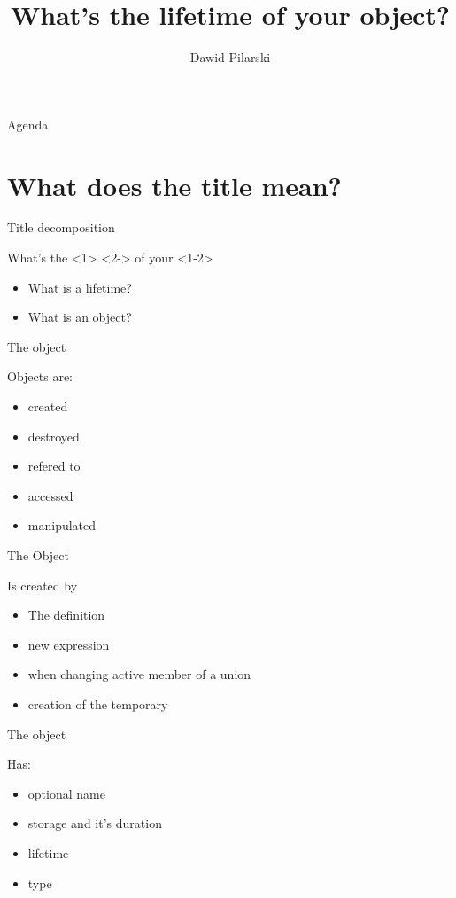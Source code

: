 \documentclass{panicsoftware-presentation}
\title{What's the lifetime of your object?}
\author{Dawid Pilarski}
\makeatletter
\newenvironment{itemizeSeq}{\begin{itemize}[<+-|@alert+>]}{\end{itemize}}
\makeatother
\begin{document}
\begin{frame}{Agenda}
	\tableofcontents
\end{frame}

\section{What does the title mean?}

\begin{frame}{Title decomposition}

\centerline{What's the <1> <2-> of your <1-2> }
\pause
\begin{itemizeSeq}
	\item What is a lifetime?
	\item What is an object?
\end{itemizeSeq}

\end{frame}

\begin{frame}{The object}

Objects are:
\begin{itemizeSeq}
	\item created
	\item destroyed
	\item refered to
	\item accessed
	\item manipulated
\end{itemizeSeq}

\end{frame}

\begin{frame}{The Object}

Is created by
\begin{itemizeSeq}
	\item The definition
	\item new expression
	\item when changing active member of a union
	\item creation of the temporary
\end{itemizeSeq}


\end{frame}

\begin{frame}{The object}

Has:
\begin{itemizeSeq}
	\item optional name
	\item storage and it's duration
	\item lifetime
	\item type
\end{itemizeSeq}

\end{frame}
\end{document}

